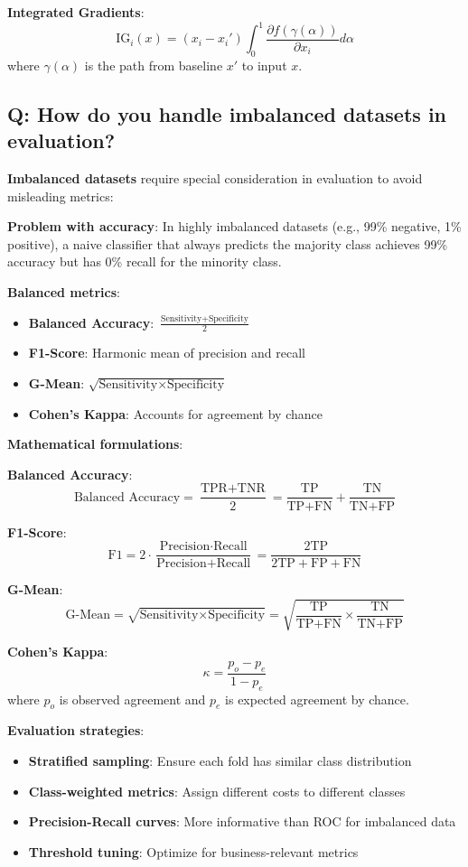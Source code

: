 \textbf{Integrated Gradients}:
\[
\text{IG}_i(x) = (x_i - x_i') \int_0^1 \frac{\partial f(\gamma(\alpha))}{\partial x_i} d\alpha
\]
where \(\gamma(\alpha)\) is the path from baseline \(x'\) to input \(x\).

\subsection*{Q: How do you handle imbalanced datasets in evaluation?}
\textbf{Imbalanced datasets} require special consideration in evaluation to avoid misleading metrics:

\textbf{Problem with accuracy}:
In highly imbalanced datasets (e.g., 99\% negative, 1\% positive), a naive classifier that always predicts the majority class achieves 99\% accuracy but has 0\% recall for the minority class.

\textbf{Balanced metrics}:
\begin{itemize}
	\item \textbf{Balanced Accuracy}: \(\frac{\text{Sensitivity} + \text{Specificity}}{2}\)
	\item \textbf{F1-Score}: Harmonic mean of precision and recall
	\item \textbf{G-Mean}: \(\sqrt{\text{Sensitivity} \times \text{Specificity}}\)
	\item \textbf{Cohen's Kappa}: Accounts for agreement by chance
\end{itemize}

\textbf{Mathematical formulations}:

\textbf{Balanced Accuracy}:
\[
\text{Balanced Accuracy} = \frac{\text{TPR} + \text{TNR}}{2} = \frac{\text{TP}}{\text{TP} + \text{FN}} + \frac{\text{TN}}{\text{TN} + \text{FP}}
\]

\textbf{F1-Score}:
\[
\text{F1} = 2 \cdot \frac{\text{Precision} \cdot \text{Recall}}{\text{Precision} + \text{Recall}} = \frac{2 \text{TP}}{2 \text{TP} + \text{FP} + \text{FN}}
\]

\textbf{G-Mean}:
\[
\text{G-Mean} = \sqrt{\text{Sensitivity} \times \text{Specificity}} = \sqrt{\frac{\text{TP}}{\text{TP} + \text{FN}} \times \frac{\text{TN}}{\text{TN} + \text{FP}}}
\]

\textbf{Cohen's Kappa}:
\[
\kappa = \frac{p_o - p_e}{1 - p_e}
\]
where \(p_o\) is observed agreement and \(p_e\) is expected agreement by chance.

\textbf{Evaluation strategies}:
\begin{itemize}
	\item \textbf{Stratified sampling}: Ensure each fold has similar class distribution
	\item \textbf{Class-weighted metrics}: Assign different costs to different classes
	\item \textbf{Precision-Recall curves}: More informative than ROC for imbalanced data
	\item \textbf{Threshold tuning}: Optimize for business-relevant metrics
\end{itemize}

